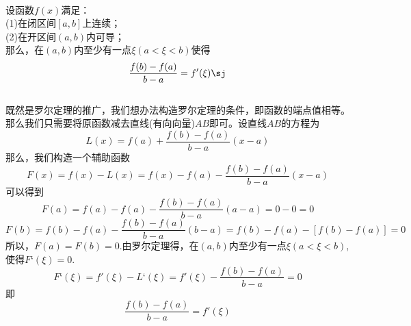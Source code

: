\sj
{}\\
\noindent 设函数$f(x)$满足：
\\ \kg(1)\enspace 在闭区间$[a,b]$上连续；\\
\kg (2)\enspace 在开区间$(a,b)$内可导；\\
那么，在$(a,b)$内至少有一点$\xi(a<\xi<b)$使得
\begin{equation}
	\frac{f(b)-f(a)}{b-a}=f'(\xi)\sj
\end{equation}
\\ \proof 既然是罗尔定理的推广，我们想办法构造罗尔定理的条件，即函数的端点值相等。那么我们只需要将原函数减去直线(有向向量)$AB$即可。设直线$AB$的方程为
\begin{equation}
	\nonumber
	L(x)=f(a)+\frac{f(b)-f(a)}{b-a}(x-a)
\end{equation}
那么，我们构造一个辅助函数
\begin{equation}
	\nonumber
	F(x)=f(x)-L(x)=f(x)-f(a)-\frac{f(b)-f(a)}{b-a}(x-a)
\end{equation}
可以得到
\begin{equation}
\nonumber
	F(a)=f(a)-f(a)-\frac{f(b)-f(a)}{b-a}(a-a)=0-0=0
\end{equation}
\begin{equation}
	\nonumber
	F(b)=f(b)-f(a)-\frac{f(b)-f(a)}{b-a}(b-a)=f(b)-f(a)-[f(b)-f(a)]=0
\end{equation}
所以，$F(a)=F(b)=0$.由罗尔定理得，在$(a,b)$内至少有一点$\xi(a<\xi<b)$,使得$F‘(\xi)=0$.
\begin{equation}
	\nonumber
	F‘(\xi)=f'(\xi)-L‘(\xi)=f'(\xi)-\frac{f(b)-f(a)}{b-a}=0
\end{equation}
即\begin{equation}
	\nonumber
	\frac{f(b)-f(a)}{b-a}=f'(\xi)
\end{equation}
\